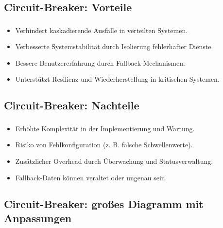 \subsection{Circuit-Breaker: Vorteile}
\begin{frame}
    \frametitle{\insertsection}
    \framesubtitle{\insertsubsection}

    \begin{itemize}
        \item Verhindert kaskadierende Ausfälle in verteilten Systemen.
        \item Verbesserte Systemstabilität durch Isolierung fehlerhafter Dienste.
        \item Bessere Benutzererfahrung durch Fallback-Mechanismen.
        \item Unterstützt Resilienz und Wiederherstellung in kritischen Systemen.
    \end{itemize}
\end{frame}

\subsection{Circuit-Breaker: Nachteile}
\begin{frame}
    \frametitle{\insertsection}
    \framesubtitle{\insertsubsection}

    \begin{itemize}
        \item Erhöhte Komplexität in der Implementierung und Wartung.
        \item Risiko von Fehlkonfiguration (z. B. falsche Schwellenwerte).
        \item Zusätzlicher Overhead durch Überwachung und Statusverwaltung.
        \item Fallback-Daten können veraltet oder ungenau sein.
    \end{itemize}
\end{frame}

\subsection{Circuit-Breaker: großes Diagramm mit Anpassungen}
\begin{frame}
    \frametitle{\insertsection}
    \framesubtitle{\insertsubsection}

\end{frame}

